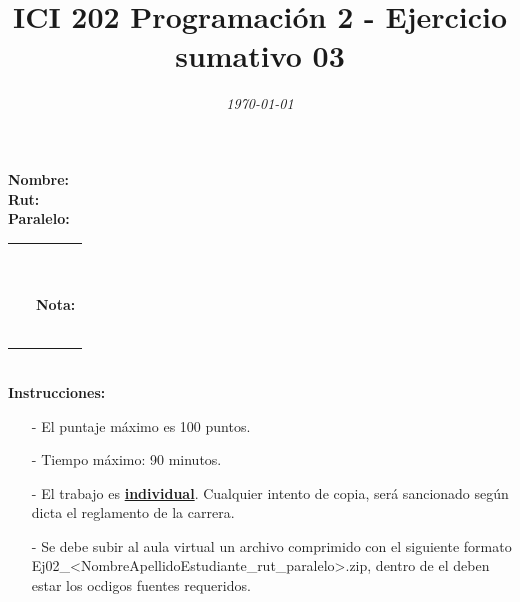 \documentclass{exam}
\title{\LARGE\color{azul}\textbf{ICI 202 Programaci\'on 2 - Ejercicio sumativo 03 }}
\author{\normalsize \color{gray}{Prof.} \color{black}{\textbf{Ismael Figueroa, Eduardo Godoy}}}
\date{\normalsize \em \today}
\begin{document}

\maketitle

\begin{multicols}{2} \begin{flushleft} \textbf{Nombre:} \\ \vspace*{2mm} \textbf{Rut:} \\ \vspace*{2mm} \textbf{Paralelo:} \end{flushleft} \begin{center} \begin{table}[H] \begin{tabular}{p{4cm}|p{3cm}|} \arrayrulecolor{gray!50}\cline{2-2} ~ & {\em {\scriptsize \color{gray!50}{Puntaje:}}} \\ & ~ \\ ~ & \textbf{Nota:} \\ & ~ \\ \arrayrulecolor{gray!50}\cline{2-2} \end{tabular} \end{table} \end{center} \end{multicols}

\vspace*{-18mm}
\noindent
\textbf{\\Instrucciones:}
\begin{itemize}
    \item[-] El puntaje m\'aximo  es 100 puntos.
    \item[-] Tiempo m\'aximo: 90 minutos.
    \item[-] El trabajo es \underline{\textbf{individual}}. Cualquier intento de copia, ser\'a sancionado seg\'un dicta el reglamento de la carrera.
    \item[-] Se debe subir al aula virtual un archivo comprimido con el siguiente formato  Ej02\_<NombreApellidoEstudiante\_rut\_paralelo>.zip, dentro de el deben estar los ocdigos fuentes requeridos.
\end{itemize}
\end{document}
